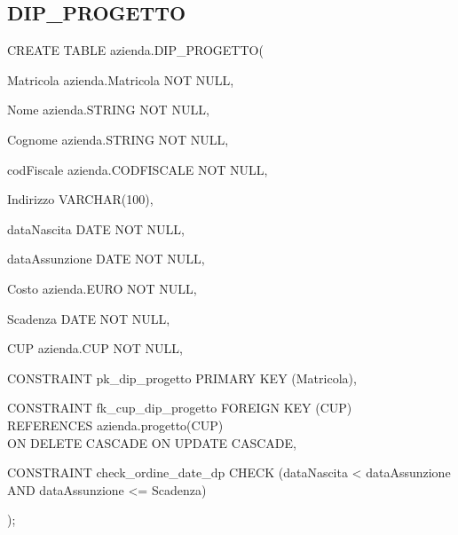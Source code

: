         \subsection{DIP\_PROGETTO}
            \ttfamily
                \begin{flushleft}
                    \begin{description}
                        \item CREATE TABLE azienda.DIP\_PROGETTO(                
                        \begin{description}
                            \item Matricola azienda.Matricola NOT NULL,
                            \item Nome azienda.STRING NOT NULL,
                            \item Cognome azienda.STRING NOT NULL,
                            \item codFiscale azienda.CODFISCALE NOT NULL,
                            \item Indirizzo VARCHAR(100),
                            \item dataNascita DATE NOT NULL,
                            \item dataAssunzione DATE NOT NULL,
                            \item Costo azienda.EURO NOT NULL,
                            \item Scadenza DATE NOT NULL,
                            \item CUP azienda.CUP NOT NULL,
                            
                            \vspace{0.5cm}

                            \item CONSTRAINT pk\_dip\_progetto PRIMARY KEY (Matricola),
                            \item CONSTRAINT fk\_cup\_dip\_progetto FOREIGN KEY (CUP)\\
                            REFERENCES azienda.progetto(CUP)\\
                            ON DELETE CASCADE	ON UPDATE CASCADE,
                            \item CONSTRAINT check\_ordine\_date\_dp CHECK (dataNascita < dataAssunzione AND dataAssunzione <= Scadenza)
                        \end{description}
                        );
                    \end{description}
                \end{flushleft}
            \normalfont

